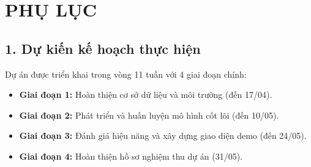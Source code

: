 \section*{PHỤ LỤC}

\subsection*{1. Dự kiến kế hoạch thực hiện}
Dự án được triển khai trong vòng 11 tuần với 4 giai đoạn chính:
\begin{itemize}
    \item \textbf{Giai đoạn 1:} Hoàn thiện cơ sở dữ liệu và môi trường (đến 17/04).
    \item \textbf{Giai đoạn 2:} Phát triển và huấn luyện mô hình cốt lõi (đến 10/05).
    \item \textbf{Giai đoạn 3:} Đánh giá hiệu năng và xây dựng giao diện demo (đến 24/05).
    \item \textbf{Giai đoạn 4:} Hoàn thiện hồ sơ nghiệm thu dự án (31/05).
\end{itemize}

